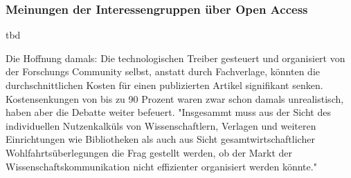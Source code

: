 \subsubsection{Meinungen der Interessengruppen über Open Access}
tbd

Die Hoffnung damals: Die technologischen Treiber gesteuert und organisiert von der Forschungs Community selbst, anstatt durch Fachverlage, könnten die durchschnittlichen Kosten für einen publizierten Artikel signifikant senken. Kostensenkungen von bis zu 90 Prozent\cite{hilf_2004} waren zwar schon damals unrealistisch, haben aber die Debatte weiter befeuert. "Insgesammt muss aus der Sicht des individuellen Nutzenkalküls von Wissenschaftlern, Verlagen und weiteren Einrichtungen wie Bibliotheken als auch aus Sicht gesamtwirtschaftlicher Wohlfahrtsüberlegungen die Frag gestellt werden, ob der Markt der Wissenschaftskommunikation nicht effizienter organisiert werden könnte."\cite{Hess_2006}